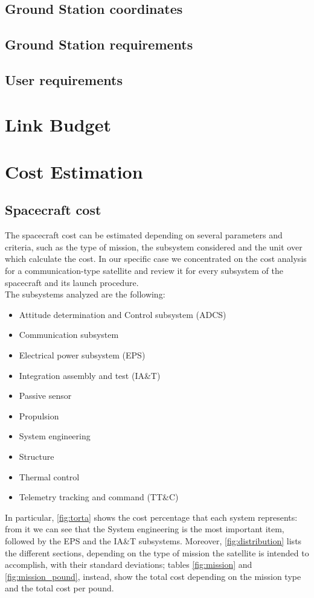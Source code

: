 \documentclass[11pt,a4paper,titlepage]{article}
\begin{document}
	\subsection{Ground Station coordinates}
		\lipsum[1]
	\subsection{Ground Station requirements}
		\lipsum[1]
	\subsection{User requirements}

\section{Link Budget}
	

\section{Cost Estimation}
	\subsection{Spacecraft cost}
		The spacecraft cost can be estimated depending on several parameters and criteria, such as the type of mission, the 				subsystem considered and the unit over which calculate the cost. In our specific case we concentrated on the cost analysis 		for a communication-type satellite and review it for every subsystem of the spacecraft and its launch procedure.\\

		The subsystems analyzed  are the following:
		\begin{itemize}
			\item Attitude determination and Control subsystem (ADCS)
			\item Communication subsystem
			\item Electrical power subsystem (EPS)
			\item Integration assembly and test (IA\&T)
			\item Passive sensor
			\item Propulsion
			\item System engineering
			\item Structure
			\item Thermal control
			\item Telemetry tracking and command (TT\&C)
		\end{itemize}
		In particular, \autoref{fig:torta} shows the cost percentage that each system represents: from it we can see that the 				System engineering is the most important item, followed by the EPS and the IA\&T subsystems. Moreover, 						\autoref{fig:distribution} lists the different sections, depending on the type of mission the satellite is intended to 					accomplish, with their standard deviations; tables \ref{fig:mission} and \ref{fig:mission_pound}, instead, show the total 			cost depending on the mission type and the total cost per pound.
\end{document}
